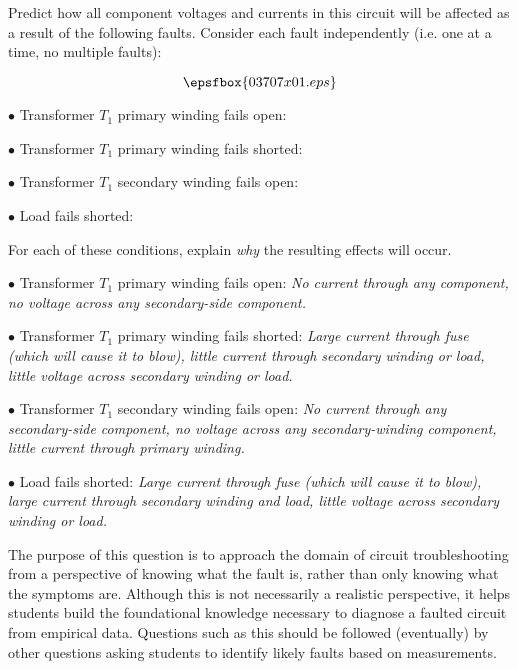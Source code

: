 

Predict how all component voltages and currents in this circuit will be affected as a result of the following faults.  Consider each fault independently (i.e. one at a time, no multiple faults):

$$\epsfbox{03707x01.eps}$$

\medskip
\item{$\bullet$} Transformer $T_1$ primary winding fails open:
\vskip 5pt
\item{$\bullet$} Transformer $T_1$ primary winding fails shorted:
\vskip 5pt
\item{$\bullet$} Transformer $T_1$ secondary winding fails open:
\vskip 5pt
\item{$\bullet$} Load fails shorted:
\medskip

For each of these conditions, explain {\it why} the resulting effects will occur.







\medskip
\item{$\bullet$} Transformer $T_1$ primary winding fails open: {\it No current through any component, no voltage across any secondary-side component.}
\vskip 5pt
\item{$\bullet$} Transformer $T_1$ primary winding fails shorted: {\it Large current through fuse (which will cause it to blow), little current through secondary winding or load, little voltage across secondary winding or load.}
\vskip 5pt
\item{$\bullet$} Transformer $T_1$ secondary winding fails open: {\it No current through any secondary-side component, no voltage across any secondary-winding component, little current through primary winding.}
\vskip 5pt
\item{$\bullet$} Load fails shorted: {\it Large current through fuse (which will cause it to blow), large current through secondary winding and load, little voltage across secondary winding or load.}
\medskip







The purpose of this question is to approach the domain of circuit troubleshooting from a perspective of knowing what the fault is, rather than only knowing what the symptoms are.  Although this is not necessarily a realistic perspective, it helps students build the foundational knowledge necessary to diagnose a faulted circuit from empirical data.  Questions such as this should be followed (eventually) by other questions asking students to identify likely faults based on measurements.




